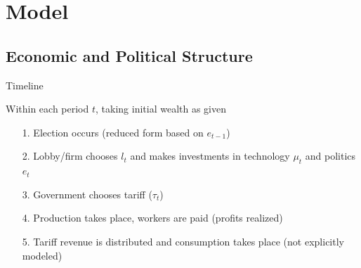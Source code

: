 \documentclass{beamer}
\begin{document}

 








\section{Model}
\subsection{Economic and Political Structure}
\begin{frame}{Timeline}
\pause

Within each period $t$, taking initial wealth as given
\pause
\begin{enumerate}[<+->]
	\item[1.] Election occurs (reduced form based on $e_{t-1}$)
	\item[2.] Lobby/firm chooses $l_t$ and makes investments in technology $\mu_t$ and politics $e_t$
	\item[3.] Government chooses tariff ($\tau_t$)
	\item[4.] Production takes place, workers are paid (profits realized)
	\item[5.] Tariff revenue is distributed and consumption takes place (not explicitly modeled)
\end{enumerate}
\end{frame}
\end{document}
